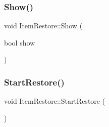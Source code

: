 \hypertarget{class_item_restore_a7681e3e167a259eb4e11e02bc477d5ea}{}\label{class_item_restore_a7681e3e167a259eb4e11e02bc477d5ea} 
\subsubsection{\texorpdfstring{Show()}{Show()}}
{\footnotesize\ttfamily void Item\+Restore\+::\+Show (\begin{DoxyParamCaption}\item[{bool}]{show }\end{DoxyParamCaption})}

\hypertarget{class_item_restore_aa47f7ced936cbf52586d9476cecbc6cd}{}\label{class_item_restore_aa47f7ced936cbf52586d9476cecbc6cd} 
\subsubsection{\texorpdfstring{Start\+Restore()}{StartRestore()}}
{\footnotesize\ttfamily void Item\+Restore\+::\+Start\+Restore (\begin{DoxyParamCaption}{ }\end{DoxyParamCaption})}

